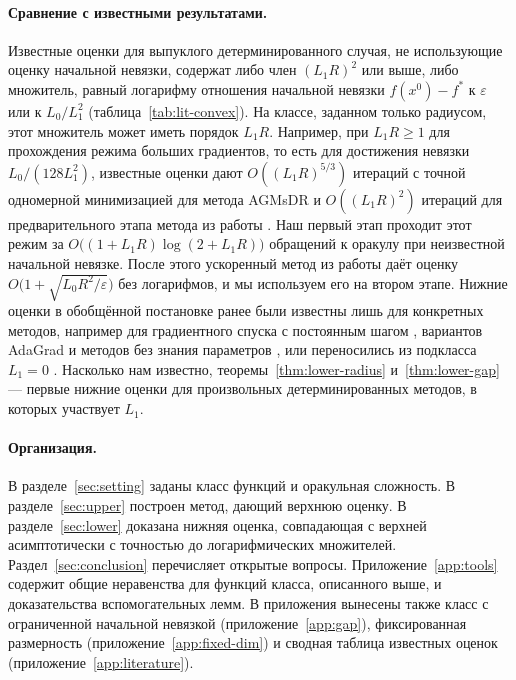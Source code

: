 \documentclass[11pt,a4paper]{article}
\begin{document}
\paragraph{Сравнение с известными результатами.} Известные оценки для выпуклого детерминированного случая, не использующие оценку начальной невязки, содержат либо член $(L_1R)^2$ или выше, либо множитель, равный логарифму отношения начальной невязки $f(x^0)-f^\ast$ к $\varepsilon$ или к $L_0/L_1^2$ (таблица~\ref{tab:lit-convex}). На классе, заданном только радиусом, этот множитель может иметь порядок $L_1R$. Например, при $L_1R\ge1$ для прохождения режима больших градиентов, то есть для достижения невязки $L_0/(128L_1^2)$, известные оценки дают $O((L_1R)^{5/3})$ итераций с точной одномерной минимизацией для метода AGMsDR \citep{vankov2025optimizing} и $O((L_1R)^2)$ итераций для предварительного этапа метода из работы \citet{tyurin2026accelerated}. Наш первый этап проходит этот режим за $O\bigl((1+L_1R)\log(2+L_1R)\bigr)$ обращений к оракулу при неизвестной начальной невязке. После этого ускоренный метод из работы \citet[теорема~3.2]{tyurin2026accelerated} даёт оценку $O\bigl(1+\sqrt{L_0R^2/\varepsilon}\bigr)$ без логарифмов, и мы используем его на втором этапе. Нижние оценки в обобщённой постановке ранее были известны лишь для конкретных методов, например для градиентного спуска с постоянным шагом \citep{zhang2019gradient,crawshaw2022robustness}, вариантов AdaGrad \citep{crawshaw2025lower} и методов без знания параметров \citep{hubler2024parameter}, или переносились из подкласса $L_1=0$ \citep{nesterov2018lectures}. Насколько нам известно, теоремы~\ref{thm:lower-radius} и~\ref{thm:lower-gap} --- первые нижние оценки для произвольных детерминированных методов, в которых участвует $L_1$.

\paragraph{Организация.} В разделе~\ref{sec:setting} заданы класс функций и оракульная сложность. В разделе~\ref{sec:upper} построен метод, дающий верхнюю оценку. В разделе~\ref{sec:lower} доказана нижняя оценка, совпадающая с верхней асимптотически с точностью до логарифмических множителей. Раздел~\ref{sec:conclusion} перечисляет открытые вопросы. Приложение~\ref{app:tools} содержит общие неравенства для функций класса, описанного выше, и доказательства вспомогательных лемм. В приложения вынесены также класс с ограниченной начальной невязкой (приложение~\ref{app:gap}), фиксированная размерность (приложение~\ref{app:fixed-dim}) и сводная таблица известных оценок (приложение~\ref{app:literature}).
\end{document}
